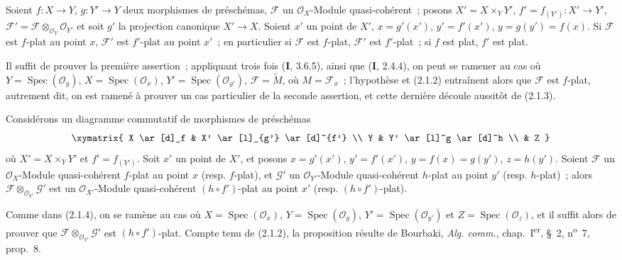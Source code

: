 \begin{proposition}[2.1.4]
\label{IV.2.1.4-fr}
Soient $f:X\to Y$, $g:Y'\to Y$ deux morphismes de préschémas, $\mathscr F$
un $\mathcal O_X$-Module quasi-cohérent~; posons $X'=X\times_Y Y'$,
$f'=f_{(Y')}:X'\to Y'$, $\mathscr F'=\mathscr F\otimes_{\mathcal O_Y}\mathcal O_{Y'}$
et soit $g'$ la projection canonique $X'\to X$. Soient $x'$ un point de
$X'$, $x=g'(x')$, $y'=f'(x')$, $y=g(y')=f(x)$. Si $\mathscr F$ est $f$-plat
au point $x$, $\mathscr F'$ est $f'$-plat au point $x'$~; en particulier si
$\mathscr F$ est $f$-plat, $\mathscr F'$ est $f'$-plat~; si $f$ est plat,
$f'$ est plat.
\end{proposition}

Il suffit de prouver la première assertion~; appliquant trois fois (\textbf{I}, 3.6.5),
ainsi que (\textbf{I}, 2.4.4), on peut se ramener au cas où
$Y=\operatorname{Spec}(\mathcal O_y)$, $X=\operatorname{Spec}(\mathcal O_x)$,
$Y'=\operatorname{Spec}(\mathcal O_{y'})$, $\mathscr F=\widetilde M$, où
$M=\mathscr F_x$~; l'hypothèse et (2.1.2) entraînent alors que $\mathscr F$
est $f$-plat, autrement dit, on est ramené à prouver un cas particulier de la
seconde assertion, et cette dernière découle aussitôt de (2.1.3).

\begin{proposition}[2.1.5]
\label{IV.2.1.5-fr}
Considérons un diagramme commutatif de morphismes de préschémas
\[
\xymatrix{
  X \ar[d]_f & X' \ar[l]_{g'} \ar[d]^{f'} \\
  Y & Y' \ar[l]^g \ar[d]^h \\
  & Z
}
\]
où $X'=X\times_Y Y'$ et $f'=f_{(Y')}$. Soit $x'$ un point de $X'$, et
posons $x=g'(x')$, $y'=f'(x')$, $y=f(x)=g(y')$, $z=h(y')$. Soient
$\mathscr F$ un $\mathcal O_X$-Module quasi-cohérent $f$-plat au point $x$
(\textup{resp.} $f$-plat), et $\mathscr G'$ un $\mathcal O_{Y'}$-Module quasi-cohérent
$h$-plat au point $y'$ (\textup{resp.} $h$-plat)~; alors
$\mathscr F\otimes_{\mathcal O_{Y'}}\mathscr G'$ est un $\mathcal O_{X'}$-Module
quasi-cohérent $(h\circ f')$-plat au point $x'$ (\textup{resp.} $(h\circ f')$-plat).
\end{proposition}

Comme dans (2.1.4), on se ramène au cas où
$X=\operatorname{Spec}(\mathcal O_x)$, $Y=\operatorname{Spec}(\mathcal O_y)$,
$Y'=\operatorname{Spec}(\mathcal O_{y'})$ et
$Z=\operatorname{Spec}(\mathcal O_z)$, et il suffit alors de prouver que
$\mathscr F\otimes_{\mathcal O_{Y'}}\mathscr G'$ est $(h\circ f')$-plat. Compte tenu de
(2.1.2), la proposition résulte de Bourbaki, \emph{Alg. comm.},
chap.~I\textsuperscript{er}, \S~2, n\textsuperscript{o}~7, prop.~8.

